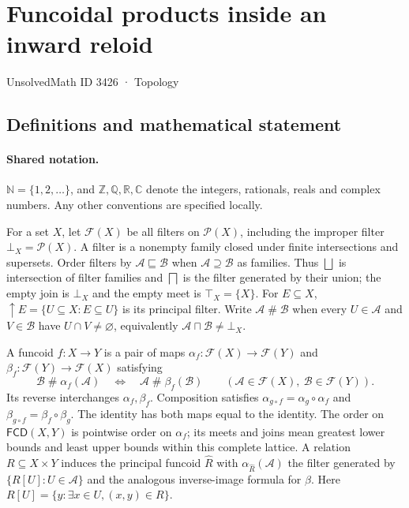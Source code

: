 \documentclass[11pt]{article}
\begin{document}
\setcounter{section}{3425}
\section{Funcoidal products inside an inward reloid}\label{3426}
{\small\sffamily UnsolvedMath ID 3426 · Topology}
\subsection{Definitions and mathematical statement}

\paragraph{Shared notation.}$\mathbb N=\{1,2,\ldots\}$, and $\mathbb Z,\mathbb Q,\mathbb R,\mathbb C$ denote the integers, rationals, reals and complex numbers. Any other conventions are specified locally.


For a set $X$, let $\mathcal F(X)$ be all filters on $\mathcal P(X)$, including the improper filter $\bot_X=\mathcal P(X)$. A filter is a nonempty family closed under finite intersections and supersets. Order filters by $\mathcal A\sqsubseteq\mathcal B$ when $\mathcal A\supseteq\mathcal B$ as families. Thus $\bigsqcup$ is intersection of filter families and $\bigsqcap$ is the filter generated by their union; the empty join is $\bot_X$ and the empty meet is $\top_X=\{X\}$. For $E\subseteq X$, $\uparrow E=\{U\subseteq X:E\subseteq U\}$ is its principal filter. Write $\mathcal A\mathrel{\#}\mathcal B$ when every $U\in\mathcal A$ and $V\in\mathcal B$ have $U\cap V\ne\varnothing$, equivalently $\mathcal A\sqcap\mathcal B\ne\bot_X$.

A funcoid $f:X\to Y$ is a pair of maps $\alpha_f:\mathcal F(X)\to\mathcal F(Y)$ and $\beta_f:\mathcal F(Y)\to\mathcal F(X)$ satisfying
\[
 \mathcal B\mathrel{\#}\alpha_f(\mathcal A)
 \quad\Longleftrightarrow\quad
 \mathcal A\mathrel{\#}\beta_f(\mathcal B)
 \qquad(\mathcal A\in\mathcal F(X),\ \mathcal B\in\mathcal F(Y)).
\]
Its reverse interchanges $\alpha_f,\beta_f$. Composition satisfies $\alpha_{g\circ f}=\alpha_g\circ\alpha_f$ and $\beta_{g\circ f}=\beta_f\circ\beta_g$. The identity has both maps equal to the identity. The order on $\mathsf{FCD}(X,Y)$ is pointwise order on $\alpha_f$; its meets and joins mean greatest lower bounds and least upper bounds within this complete lattice. A relation $R\subseteq X\times Y$ induces the principal funcoid $\widehat R$ with $\alpha_{\widehat R}(\mathcal A)$ the filter generated by $\{R[U]:U\in\mathcal A\}$ and the analogous inverse-image formula for $\beta$. Here $R[U]=\{y:\exists x\in U,(x,y)\in R\}$.
\end{document}
